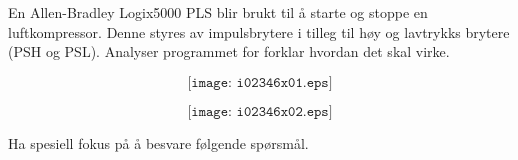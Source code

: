 


En Allen-Bradley Logix5000 PLS blir brukt til å starte og stoppe en luftkompressor. Denne styres av impulsbrytere i tilleg til høy og lavtrykks brytere (PSH og PSL). Analyser programmet for forklar hvordan det skal virke. 

$$\texttt{[image: i02346x01.eps]}$$

\filbreak

$$\texttt{[image: i02346x02.eps]}$$

Ha spesiell fokus på å besvare følgende spørsmål. 

